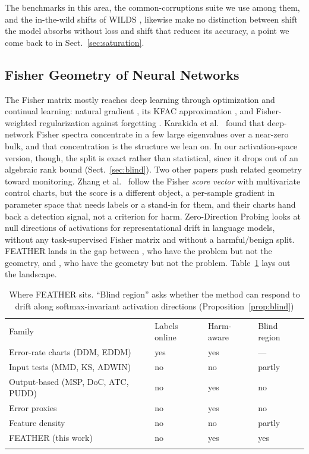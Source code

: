 \documentclass[acmsmall,screen]{acmart}
\providecommand{\svhline}{\hline}                        %
\theoremstyle{acmdefinition}
\begin{document}
The benchmarks in this
area, the common-corruptions suite \cite{hendrycks2019benchmarking} we use
among them, and the in-the-wild shifts of WILDS \cite{koh2021wilds}, likewise
make no distinction between shift the model absorbs without loss and shift that
reduces its accuracy, a point we come back to in Sect.~\ref{sec:saturation}.

\subsection{Fisher Geometry of Neural Networks}

The Fisher matrix mostly reaches deep learning through optimization and
continual learning: natural gradient \cite{amari1998natural}, its KFAC
approximation \cite{martens2015kfac}, and Fisher-weighted regularization
against forgetting \cite{kirkpatrick2017overcoming}. Karakida et al.\
\cite{karakida2019universal} found that deep-network Fisher spectra concentrate
in a few large eigenvalues over a near-zero bulk, and that concentration is the
structure we lean on. In our activation-space version, though, the split is
exact rather than statistical, since it drops out of an algebraic rank bound
(Sect.~\ref{sec:blind}). Two other papers push related geometry toward
monitoring. Zhang et al.\ \cite{zhang2023score} follow the Fisher \emph{score
vector} with multivariate control charts, but the score is a different object,
a per-sample gradient in parameter space that needs labels or a stand-in for
them, and their charts hand back a detection signal, not a criterion for harm.
Zero-Direction Probing \cite{pandey2025zdp} looks at null directions of
activations for representational drift in language models, without any
task-supervised Fisher matrix and without a harmful/benign split. FEATHER
lands in the gap between \cite{amoukou2024sequential}, who have the problem
but not the geometry, and \cite{pandey2025zdp}, who have the geometry but not
the problem. Table~\ref{tab:positioning} lays out the landscape.

\begin{table}[!t]
\caption{Where FEATHER sits. ``Blind region'' asks whether the method can
respond to drift along softmax-invariant activation directions
(Proposition~\ref{prop:blind})}
\label{tab:positioning}
\begin{tabular}{p{4.6cm}p{1.6cm}p{1.6cm}p{1.6cm}}
\hline\noalign{\smallskip}
Family & Labels online & Harm-aware & Blind region \\
\noalign{\smallskip}\svhline\noalign{\smallskip}
Error-rate charts (DDM, EDDM) & yes & yes & --- \\
Input tests (MMD, KS, ADWIN) & no & no & partly \\
Output-based (MSP, DoC, ATC, PUDD) & no & yes & no \\
Error proxies \cite{amoukou2024sequential} & no & yes & no \\
Feature density \cite{lee2018mahalanobis} & no & no & partly \\
FEATHER (this work) & no & yes & yes \\
\noalign{\smallskip}\hline\noalign{\smallskip}
\end{tabular}
\end{table}
\end{document}
